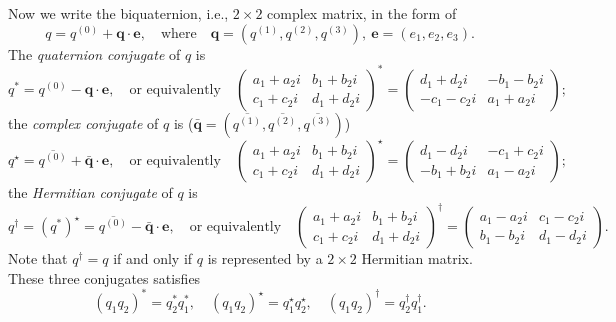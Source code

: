 \documentclass[11pt, a4paper]{article}
\numberwithin{equation}{section}
\newcommand{\ie}{i.e.}
\renewcommand{\vec}[1]{\mathbf{#1}}
\theoremstyle{definition}
\theoremstyle{remark}
\begin{document}
Now we write the biquaternion, \ie, $2 \times 2$ complex matrix, in the form of
\begin{equation}
  q = q^{(0)} + \vec{q} \cdot \vec{e}, \quad \text{where} \quad \vec{q} = (q^{(1)}, q^{(2)}, q^{(3)}), \ \vec{e} = (e_1, e_2, e_3).
\end{equation}
The \emph{quaternion conjugate} of $q$ is
\begin{equation}
  q^* = q^{(0)} - \vec{q} \cdot \vec{e}, \quad \text{or equivalently} \quad
  \begin{pmatrix}
    a_1 + a_2 i & b_1 + b_2 i \\
    c_1 + c_2 i & d_1 + d_2 i
  \end{pmatrix}^*
  =
  \begin{pmatrix}
    d_1 + d_2 i & -b_1 - b_2 i \\
    -c_1 - c_2 i & a_1 + a_2 i
  \end{pmatrix};
\end{equation}
the \emph{complex conjugate} of $q$ is ($\bar{\vec{q}} = (\overline{q^{(1)}}, \overline{q^{(2)}}, \overline{q^{(3)}})$)
\begin{equation}
  q^{\star} = \overline{q^{(0)}} + \bar{\vec{q}} \cdot \vec{e}, \quad \text{or equivalently} \quad
  \begin{pmatrix}
    a_1 + a_2 i & b_1 + b_2 i \\
    c_1 + c_2 i & d_1 + d_2 i
  \end{pmatrix}^{\star}
  =
  \begin{pmatrix}
    d_1 - d_2 i & -c_1 + c_2 i \\
    -b_1 + b_2 i & a_1 - a_2 i
  \end{pmatrix};
\end{equation}
the \emph{Hermitian conjugate} of $q$ is
\begin{equation}
  q^{\dagger} = (q^*)^{\star} = \overline{q^{(0)}} - \bar{\vec{q}} \cdot \vec{e}, \quad \text{or equivalently} \quad
  \begin{pmatrix}
    a_1 + a_2 i & b_1 + b_2 i \\
    c_1 + c_2 i & d_1 + d_2 i
  \end{pmatrix}^{\dagger}
  =
  \begin{pmatrix}
    a_1 - a_2 i & c_1 - c_2 i \\
    b_1 - b_2 i & d_1 - d_2 i
  \end{pmatrix}.
\end{equation}
Note that $q^{\dagger} = q$ if and only if $q$ is represented by a $2 \times 2$ Hermitian matrix. These three conjugates satisfies
\begin{equation}
  (q_1 q_2)^* = q^*_2 q^*_1, \quad (q_1 q_2)^{\star} = q^{\star}_1 q^{\star}_2, \quad (q_1 q_2)^{\dagger} = q^{\dagger}_2 q^{\dagger}_1.
\end{equation}
\end{document}
